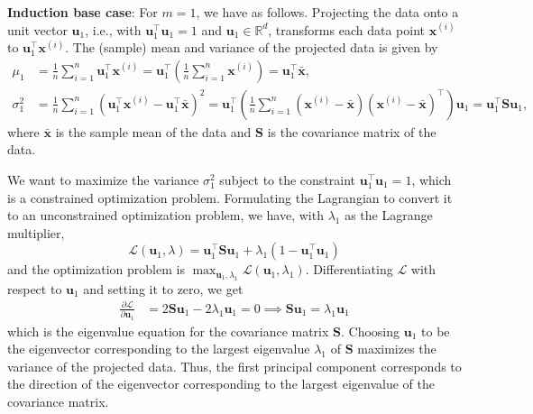 \textbf{Induction base case}:
For \( m = 1 \), we have as follows.
Projecting the data onto a unit vector \( \mathbf{u}_1 \), i.e., with \( \mathbf{u}_1^\top \mathbf{u}_1 = 1 \) and \( \mathbf{u}_1 \in \mathbb{R}^d \), transforms each data point \( \mathbf{x}^{(i)} \) to \( \mathbf{u}_1^\top \mathbf{x}^{(i)} \).
The (sample) mean and variance of the projected data is given by
\begin{align*}
    \mu_1
     & =
    \frac{1}{n} \sum_{i=1}^{n} \mathbf{u}_1^\top \mathbf{x}^{(i)}
    =
    \mathbf{u}_1^\top \left( \frac{1}{n} \sum_{i=1}^{n} \mathbf{x}^{(i)} \right)
    =
    \mathbf{u}_1^\top \bar{\mathbf{x}},
    \\
    \sigma_1^2
     & =
    \frac{1}{n} \sum_{i=1}^{n} {( \mathbf{u}_1^\top \mathbf{x}^{(i)} - \mathbf{u}_1^\top \bar{\mathbf{x}} )}^2
    =
    \mathbf{u}_1^\top \left( \frac{1}{n} \sum_{i=1}^{n} {(\mathbf{x}^{(i)} - \bar{\mathbf{x}})}{(\mathbf{x}^{(i)} - \bar{\mathbf{x}})^\top} \right) \mathbf{u}_1
    =
    \mathbf{u}_1^\top \mathbf{S} \mathbf{u}_1,
\end{align*}
where \( \bar{\mathbf{x}} \) is the sample mean of the data and \( \mathbf{S} \) is the covariance matrix of the data.

We want to maximize the variance \( \sigma_1^2 \) subject to the constraint \( \mathbf{u}_1^\top \mathbf{u}_1 = 1 \), which is a constrained optimization problem.
Formulating the Lagrangian to convert it to an unconstrained optimization problem, we have, with \( \lambda_1 \) as the Lagrange multiplier,
\begin{equation*}
    \mathcal{L}(\mathbf{u}_1, \lambda)
    =
    \mathbf{u}_1^\top \mathbf{S} \mathbf{u}_1 + \lambda_1 (1 - \mathbf{u}_1^\top \mathbf{u}_1)
\end{equation*}
and the optimization problem is \( \max_{\mathbf{u}_1, \lambda_1} \mathcal{L}(\mathbf{u}_1, \lambda_1) \).
Differentiating \( \mathcal{L} \) with respect to \( \mathbf{u}_1 \) and setting it to zero, we get
\begin{align*}
    \frac{\partial \mathcal{L}}{\partial \mathbf{u}_1}
     & =
    2 \mathbf{S} \mathbf{u}_1 - 2 \lambda_1 \mathbf{u}_1
    =
    0
    \implies
    \mathbf{S} \mathbf{u}_1 = \lambda_1 \mathbf{u}_1
\end{align*}
which is the eigenvalue equation for the covariance matrix \( \mathbf{S} \).
Choosing \( \mathbf{u}_1 \) to be the eigenvector corresponding to the largest eigenvalue \( \lambda_1 \) of \( \mathbf{S} \) maximizes the variance of the projected data.
Thus, the first principal component corresponds to the direction of the eigenvector corresponding to the largest eigenvalue of the covariance matrix.

